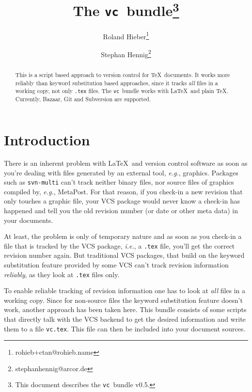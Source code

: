 \documentclass[11pt]{article}
\newcommand*{\pkg}{\texttt{vc}}
\begin{document}
\author{Roland Hieber\thanks{rohieb+ctan@rohieb.name} \and
    Stephan Hennig\thanks{stephanhennig@arcor.de}}
\title{The \pkg\ bundle\thanks{This document describes the \pkg\ bundle
    v0.5.}}
\maketitle
\begin{abstract}
  This is a script based approach to version control for \TeX\
  documents.  It works more reliably than keyword substitution based
  approaches, since it tracks \emph{all} files in a working copy, not
  only \texttt{.tex} files.  The \pkg\ bundle works with \LaTeX\ and
  plain \TeX.  Currently, Bazaar, Git and Subversion are supported.
\end{abstract}
\begin{multicols}{2}
\tableofcontents
\end{multicols}



\section{Introduction}
There is an inherent problem with \LaTeX\ and version control software
as soon as you're dealing with files generated by an external tool,
\emph{e.g.}, graphics.  Packages such as \texttt{svn-multi} can't track
neither binary files, nor source files of graphics compiled by,
\emph{e.g.}, MetaPost.  For that reason, if you check-in a new revision
that only touches a graphic file, your VCS package would never know a
check-in has happened and tell you the old revision number (or date or
other meta data) in your documents.

At least, the problem is only of temporary nature and as soon as you
check-in a file that is tracked by the VCS package, \emph{i.e.}, a
\texttt{.tex} file, you'll get the correct revision number again.  But
traditional VCS packages, that build on the keyword substitution feature
provided by some VCS can't track revision information \emph{reliably},
as they look at \texttt{.tex} files only.

To enable reliable tracking of revision information one has to look at
\emph{all} files in a working copy.  Since for non-source files the
keyword substitution feature doesn't work, another approach has been
taken here.  This bundle consists of some scripts that directly talk
with the VCS backend to get the desired information and write them to a
file \texttt{vc.tex}.  This file can then be included into your document
sources.
\end{document}
